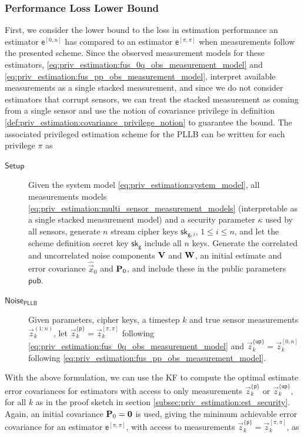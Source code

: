 \subsubsection{Performance Loss Lower Bound}
First, we consider the lower bound to the loss in estimation performance an estimator $\mathsf{e}^{[0, n]}$ has compared to an estimator $\mathsf{e}^{[\pi,\pi]}$ when measurements follow the presented scheme. Since the observed measurement models for these estimators, \eqref{eq:priv_estimation:fus_0q_obs_measurement_model} and \eqref{eq:priv_estimation:fus_pp_obs_measurement_model}, interpret available measurements as a single stacked measurement, and since we do not consider estimators that corrupt sensors, we can treat the stacked measurement as coming from a single sensor and use the notion of covariance privilege in definition \ref{def:priv_estimation:covariance_privilege_notion} to guarantee the bound. The associated privileged estimation scheme for the PLLB can be written for each privilege $\pi$ as
\begin{description}
    \item[$\mathsf{Setup}$] Given the system model \eqref{eq:priv_estimation:system_model}, all measurements models \eqref{eq:priv_estimation:multi_sensor_measurement_models} (interpretable as a single stacked measurement model) and a security parameter $\kappa$ used by all sensors, generate $n$ stream cipher keys $\mathsf{sk}_{\mathsf{g}, i}$, $1\leq i\leq n$, and let the scheme definition secret key $\mathsf{sk}_{\mathsf{g}}$ include all $n$ keys. Generate the correlated and uncorrelated noise components ${{\mathbf{V}}}$ and ${{\mathbf{W}}}$, an initial estimate and error covariance $\hat{\vec{x}}_0$ and ${{\mathbf{P}}}_0$, and include these in the public parameters $\mathsf{pub}$.
  
    \item[$\mathsf{Noise}_{\mathsf{PLLB}}$] Given parameters, cipher keys, a timestep $k$ and true sensor measurements $\vec{z}_k^{(1:n)}$, let $\vec{z}_k^{\{\mathsf{p}\}}=\vec{z}_k^{[\pi,\pi]}$ following \eqref{eq:priv_estimation:fus_0q_obs_measurement_model} and $\vec{z}_k^{\{\mathsf{up}\}}=\vec{z}_k^{[0,n]}$ following \eqref{eq:priv_estimation:fus_pp_obs_measurement_model}.
\end{description}
With the above formulation, we can use the KF to compute the optimal estimate error covariances for estimators with access to only measurements $\vec{z}_k^{\{\mathsf{p}\}}$ or $\vec{z}_k^{\{\mathsf{up}\}}$, for all $k$ as in the proof sketch in section \ref{subsec:priv_estimation:est_security}. Again, an initial covariance ${{\mathbf{P}}}_0={{\mathbf{0}}}$ is used, giving the minimum achievable error covariance for an estimator $\mathsf{e}^{[\pi,\pi]}$, with access to measurements $\vec{z}_k^{\{\mathsf{p}\}}=\vec{z}_k^{[\pi,\pi]}$, as
